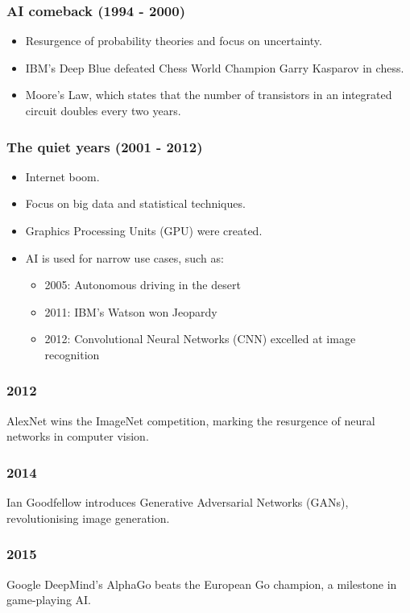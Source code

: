 \documentclass[11pt]{article}
\begin{document}
\subsubsection{AI comeback (1994 - 2000)}
\label{sec:org909213d}
\begin{itemize}
\item Resurgence of probability theories and focus on uncertainty.
\item IBM's Deep Blue defeated Chess World Champion Garry Kasparov in chess.
\item Moore's Law, which states that the number of transistors in an integrated circuit doubles every two years.
\end{itemize}
\subsubsection{The quiet years (2001 - 2012)}
\label{sec:org957e622}
\begin{itemize}
\item Internet boom.
\item Focus on big data and statistical techniques.
\item Graphics Processing Units (GPU) were created.
\item AI is used for narrow use cases, such as:
\begin{itemize}
\item 2005: Autonomous driving in the desert
\item 2011: IBM's Watson won Jeopardy
\item 2012: Convolutional Neural Networks (CNN) excelled at image recognition
\end{itemize}
\end{itemize}
\subsubsection{2012}
\label{sec:org9e743d9}
AlexNet wins the ImageNet competition, marking the resurgence of neural networks in computer vision.
\subsubsection{2014}
\label{sec:orgbae2d99}
Ian Goodfellow introduces Generative Adversarial Networks (GANs), revolutionising image generation.
\subsubsection{2015}
\label{sec:org86878b8}
Google DeepMind's AlphaGo beats the European Go champion, a milestone in game-playing AI.
\end{document}
